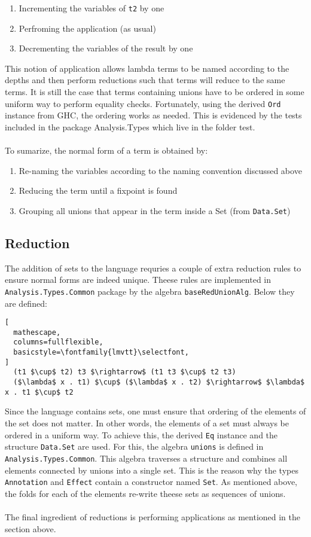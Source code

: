 \documentclass[8pt]{extarticle}
\begin{document}
\begin{enumerate}
\item Incrementing the variables of \verb+t2+ by one
\item Perfroming the application (as usual)
\item Decrementing the variables of the result by one
\end{enumerate}
This notion of application allows lambda terms to be named according to the depths and then perform reductions such that terms will reduce to the same terms. It is still the case that terms containing unions have to be ordered in some uniform way to perform equality checks. Fortunately, using the derived \verb+Ord+ instance from GHC, the ordering works as needed. This is evidenced by the tests included in the package Analysis.Types which live in the folder test.
\\\\
To sumarize, the normal form of a term is obtained by:
\begin{enumerate}
\item Re-naming the variables according to the naming convention discussed above
\item Reducing the term until a fixpoint is found
\item Grouping all unions that appear in the term inside a Set (from \verb+Data.Set+)
\end{enumerate}
\subsection{Reduction}
The addition of sets to the language requries a couple of extra reduction rules to ensure normal forms are indeed unique. Theese rules are implemented in \verb+Analysis.Types.Common+ package by the algebra \verb+baseRedUnionAlg+. Below they are defined:
\begin{lstlisting}[
  mathescape,
  columns=fullflexible,
  basicstyle=\fontfamily{lmvtt}\selectfont,
]
  (t1 $\cup$ t2) t3 $\rightarrow$ (t1 t3 $\cup$ t2 t3)
  ($\lambda$ x . t1) $\cup$ ($\lambda$ x . t2) $\rightarrow$ $\lambda$ x . t1 $\cup$ t2
\end{lstlisting}
Since the language contains sets, one must ensure that ordering of the elements of the set does not matter. In other words, the elements of a set must always be ordered in a uniform way. To achieve this, the derived \verb+Eq+ instance and the structure \verb+Data.Set+ are used. For this, the algebra \verb+unions+ is defined in \verb+Analysis.Types.Common+. This algebra traverses a structure and combines all elements connected by unions into a single set. This is the reason why the types \verb+Annotation+ and \verb+Effect+ contain a constructor named \verb+Set+. As mentioned above, the folds for each of the elements re-write theese sets as sequences of unions.
\\\\
The final ingredient of reductions is performing applications as mentioned in the section above.
\\\\
\end{document}
